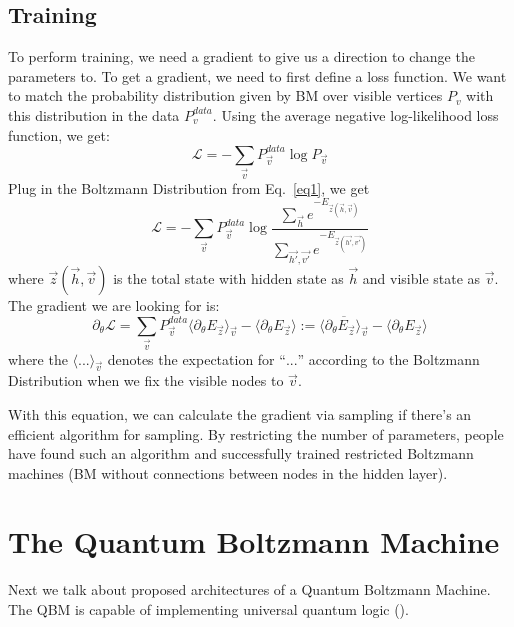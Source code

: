 \documentclass[letterpaper,11pt]{article}
\begin{document}
\subsection{Training}

To perform training, we need a gradient to give us a direction to change the parameters to. To get a gradient, we need to first define a loss function. We want to match the probability distribution given by BM over visible vertices $P_v$ with this distribution in the data $P_v^{data}$. Using the average negative log-likelihood loss function, we get:
\begin{equation} \label{eq3}
\mathcal{L} = - \sum_{\vec{v}} P_{\vec{v}}^{data} \log P_{\vec{v}}
\end{equation}
Plug in the Boltzmann Distribution from Eq.~\ref{eq1}, we get 
\begin{equation} \label{eq4}
\mathcal{L} = - \sum_{\vec{v}} P_{\vec{v}}^{data} \log \frac{\sum_{\vec{h}} e^{-E_{\vec{z}(\vec{h}, \vec{v})}}}{\sum_{\vec{h'}, \vec{v'}} e^{-E_{\vec{z}(\vec{h'}, \vec{v'})}}}
\end{equation}
where $\vec{z}(\vec{h}, \vec{v})$ is the total state with hidden state as $\vec{h}$ and visible state as $\vec{v}$. The gradient we are looking for is:
\begin{equation} \label{eq5}
\partial_{\theta} \mathcal{L} = \sum_{\vec{v}} P_{\vec{v}}^{data}\langle \partial_{\theta} E_{\vec{z}}\rangle_{\vec{v}} - \langle \partial_{\theta} E_{\vec{z}}\rangle := \overline{\langle \partial_{\theta} E_{\vec{z}}\rangle_{\vec{v}}} - \langle \partial_{\theta} E_{\vec{z}}\rangle
\end{equation}
where the $\langle ...\rangle_{\vec{v}}$ denotes the expectation for ``$...$'' according to the Boltzmann Distribution when we fix the visible nodes to $\vec{v}$. \par
With this equation, we can calculate the gradient via sampling if there's an efficient algorithm for sampling. By restricting the number of parameters, people have found such an algorithm and successfully trained restricted Boltzmann machines (BM without connections between nodes in the hidden layer). \cite{QBM}

\section{The Quantum Boltzmann Machine}
Next we talk about proposed architectures of a Quantum Boltzmann Machine. The QBM is capable of implementing universal quantum logic (\cite{NatureQML}). 
\end{document}
